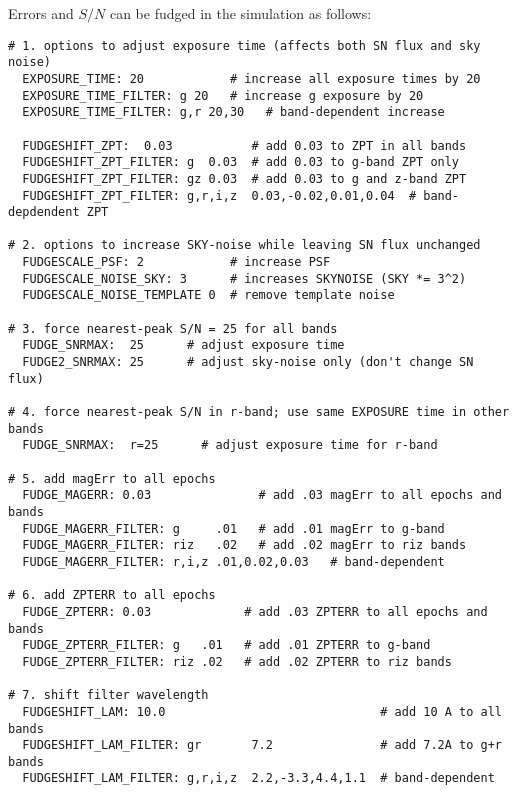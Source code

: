 \documentclass[12pt]{article}
\begin{document}
\newcommand{\FSNMAX}{\hat{F}_{\rm SN}}

Errors and $S/N$ can be fudged in the simulation  as follows:
%
\begin{Verbatim}[frame=single]
# 1. options to adjust exposure time (affects both SN flux and sky noise)
  EXPOSURE_TIME: 20            # increase all exposure times by 20
  EXPOSURE_TIME_FILTER: g 20   # increase g exposure by 20
  EXPOSURE_TIME_FILTER: g,r 20,30   # band-dependent increase

  FUDGESHIFT_ZPT:  0.03           # add 0.03 to ZPT in all bands
  FUDGESHIFT_ZPT_FILTER: g  0.03  # add 0.03 to g-band ZPT only
  FUDGESHIFT_ZPT_FILTER: gz 0.03  # add 0.03 to g and z-band ZPT
  FUDGESHIFT_ZPT_FILTER: g,r,i,z  0.03,-0.02,0.01,0.04  # band-depdendent ZPT

# 2. options to increase SKY-noise while leaving SN flux unchanged
  FUDGESCALE_PSF: 2            # increase PSF
  FUDGESCALE_NOISE_SKY: 3      # increases SKYNOISE (SKY *= 3^2)
  FUDGESCALE_NOISE_TEMPLATE 0  # remove template noise

# 3. force nearest-peak S/N = 25 for all bands 
  FUDGE_SNRMAX:  25      # adjust exposure time
  FUDGE2_SNRMAX: 25      # adjust sky-noise only (don't change SN flux)

# 4. force nearest-peak S/N in r-band; use same EXPOSURE time in other bands
  FUDGE_SNRMAX:  r=25      # adjust exposure time for r-band

# 5. add magErr to all epochs
  FUDGE_MAGERR: 0.03               # add .03 magErr to all epochs and bands
  FUDGE_MAGERR_FILTER: g     .01   # add .01 magErr to g-band 
  FUDGE_MAGERR_FILTER: riz   .02   # add .02 magErr to riz bands
  FUDGE_MAGERR_FILTER: r,i,z .01,0.02,0.03   # band-dependent

# 6. add ZPTERR to all epochs
  FUDGE_ZPTERR: 0.03             # add .03 ZPTERR to all epochs and bands
  FUDGE_ZPTERR_FILTER: g   .01   # add .01 ZPTERR to g-band 
  FUDGE_ZPTERR_FILTER: riz .02   # add .02 ZPTERR to riz bands

# 7. shift filter wavelength 
  FUDGESHIFT_LAM: 10.0                              # add 10 A to all bands
  FUDGESHIFT_LAM_FILTER: gr       7.2               # add 7.2A to g+r bands
  FUDGESHIFT_LAM_FILTER: g,r,i,z  2.2,-3.3,4.4,1.1  # band-dependent
\end{Verbatim}
%
\end{document}
